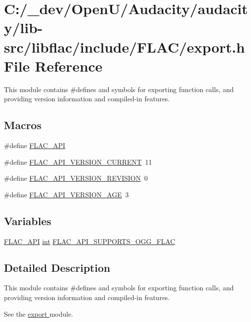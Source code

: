 \hypertarget{lib-src_2libflac_2include_2_f_l_a_c_2export_8h}{}\section{C\+:/\+\_\+dev/\+Open\+U/\+Audacity/audacity/lib-\/src/libflac/include/\+F\+L\+A\+C/export.h File Reference}
\label{lib-src_2libflac_2include_2_f_l_a_c_2export_8h}


This module contains \#defines and symbols for exporting function calls, and providing version information and compiled-\/in features.  


\subsection*{Macros}
\begin{DoxyCompactItemize}
\item 
\#define \hyperlink{group__flac__export_ga56ca07df8a23310707732b1c0007d6f5}{F\+L\+A\+C\+\_\+\+A\+PI}
\item 
\#define \hyperlink{group__flac__export_ga31180fe15eea416cd8957cfca1a4c4f8}{F\+L\+A\+C\+\_\+\+A\+P\+I\+\_\+\+V\+E\+R\+S\+I\+O\+N\+\_\+\+C\+U\+R\+R\+E\+NT}~11
\item 
\#define \hyperlink{group__flac__export_ga811641dd9f8c542d9260240e7fbe8e93}{F\+L\+A\+C\+\_\+\+A\+P\+I\+\_\+\+V\+E\+R\+S\+I\+O\+N\+\_\+\+R\+E\+V\+I\+S\+I\+ON}~0
\item 
\#define \hyperlink{group__flac__export_ga1add3e09c8dfd57e8c921f299f0bbec1}{F\+L\+A\+C\+\_\+\+A\+P\+I\+\_\+\+V\+E\+R\+S\+I\+O\+N\+\_\+\+A\+GE}~3
\end{DoxyCompactItemize}
\subsection*{Variables}
\begin{DoxyCompactItemize}
\item 
\hyperlink{group__flac__export_ga56ca07df8a23310707732b1c0007d6f5}{F\+L\+A\+C\+\_\+\+A\+PI} \hyperlink{xmltok_8h_a5a0d4a5641ce434f1d23533f2b2e6653}{int} \hyperlink{group__flac__export_gaf762876dd61fbf2da1bef49762900533}{F\+L\+A\+C\+\_\+\+A\+P\+I\+\_\+\+S\+U\+P\+P\+O\+R\+T\+S\+\_\+\+O\+G\+G\+\_\+\+F\+L\+AC}
\end{DoxyCompactItemize}


\subsection{Detailed Description}
This module contains \#defines and symbols for exporting function calls, and providing version information and compiled-\/in features. 

See the \hyperlink{group__flac__export}{export } module. 